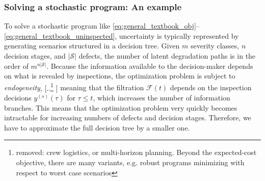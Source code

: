 \documentclass{article}
\providecommand{\DIFadd}[1]{{\protect\color{blue} \sf #1}} %
\providecommand{\DIFdel}[1]{{\protect\color{red} [..\footnote{removed: #1} ]}} %
\providecommand{\DIFaddbegin}{} %
\providecommand{\DIFaddend}{} %
\providecommand{\DIFdelbegin}{} %
\providecommand{\DIFdelend}{} %
\begin{document}
\subsubsection{\DIFadd{Solving a stochastic program: An example}}
\DIFadd{To solve a stochastic program like \cref{eq:general_textbook_obj}--\cref{eq:general_textbook_uninspected}, uncertainty is typically represented by generating scenarios structured in a decision tree.
Given $m$ severity classes, $n$ decision stages, and $|\mathcal S|$ defects, the number of latent degradation paths is in the order of $m^{n|\mathcal S|}$.
Because the information available to the decision-maker depends on what is revealed by inspections, the optimization problem is subject to \textit{endogeneity}}\DIFaddend , 
\DIFdelbegin \DIFdel{crew logistics, or multi-horizon planning.
Beyond the expected-cost objective, there are many variants, e.g. robust programs minimizing with respect to worst case scenarios}\DIFdelend %
\DIFaddbegin \DIFadd{meaning that the filtration $\mathcal F(t)$ depends on the inspection decisions $y^{(s)}(\tau)$ for $\tau\le t$, which increases the number of information branches.
This means that the optimization problem very quickly becomes intractable for increasing numbers of defects and decision stages.
Therefore, we have to approximate the full decision tree by a smaller one.
}
\end{document}
